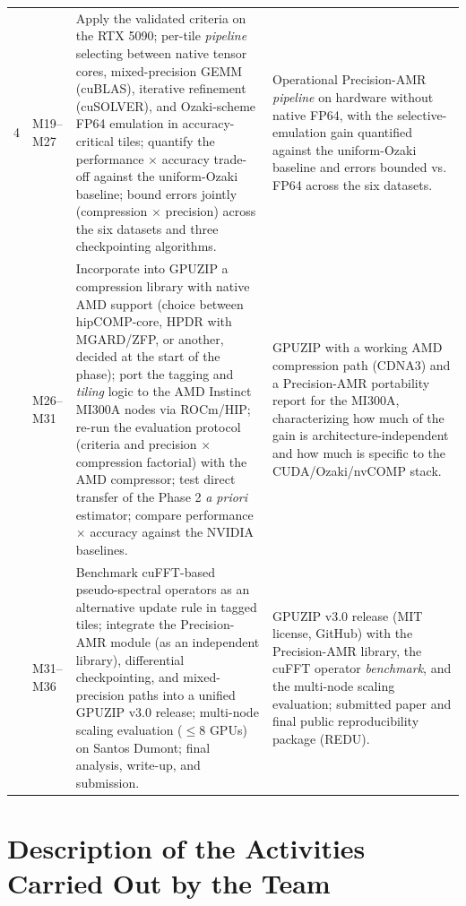\documentclass[12pt,a4paper]{article}
\begin{document}
\begin{longtable}{@{}p{}p{}p{}p{}@{}}
4 & M19--M27 & Apply the validated criteria on the RTX 5090; per-tile
\emph{pipeline} selecting between native tensor cores, mixed-precision GEMM
(cuBLAS), iterative refinement (cuSOLVER), and Ozaki-scheme FP64 emulation
in accuracy-critical tiles; quantify the performance $\times$ accuracy
trade-off against the uniform-Ozaki baseline; bound errors jointly
(compression $\times$ precision) across the six datasets and three
checkpointing algorithms. & Operational Precision-AMR \emph{pipeline} on
hardware without native FP64, with the selective-emulation gain quantified
against the uniform-Ozaki baseline and errors bounded vs. FP64 across the
six datasets.\\
\addlinespace
5 & M26--M31 & Incorporate into GPUZIP a compression library with native
AMD support (choice between hipCOMP-core, HPDR with MGARD/ZFP, or another,
decided at the start of the phase); port the tagging and \emph{tiling}
logic to the AMD Instinct MI300A nodes via ROCm/HIP; re-run the evaluation
protocol (criteria and precision $\times$ compression factorial) with the
AMD compressor; test direct transfer of the Phase 2 \emph{a priori}
estimator; compare performance $\times$ accuracy against the NVIDIA
baselines. & GPUZIP with a working AMD compression path (CDNA3) and a
Precision-AMR portability report for the MI300A, characterizing how much
of the gain is architecture-independent and how much is specific to the
CUDA/Ozaki/nvCOMP stack.\\
\addlinespace
6 & M31--M36 & Benchmark cuFFT-based pseudo-spectral operators as an
alternative update rule in tagged tiles; integrate the Precision-AMR
module (as an independent library), differential checkpointing, and
mixed-precision paths into a unified GPUZIP v3.0 release; multi-node
scaling evaluation ($\leq$8 GPUs) on Santos Dumont; final analysis,
write-up, and submission. & GPUZIP v3.0 release (MIT license, GitHub) with
the Precision-AMR library, the cuFFT operator \emph{benchmark}, and the
multi-node scaling evaluation; submitted paper and final public
reproducibility package (REDU).\\
\end{longtable}

\section{Description of the Activities Carried Out by the Team}

\end{document}
